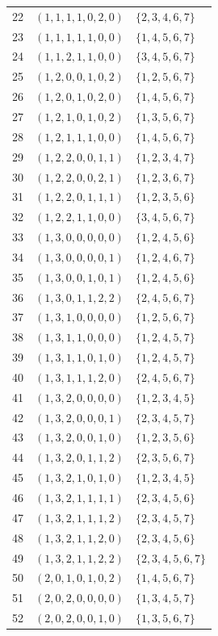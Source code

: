 \documentclass[11pt,a4paper]{article}
\theoremstyle{remark}\newtheorem{remark}[theorem]{Remark}
\begin{document}
{\begin{longtable}{r@{\qquad}c@{\qquad}l}
22 & $(1,1,1,1,0,2,0)$ & $\{2,3,4,6,7\}$ \\
23 & $(1,1,1,1,1,0,0)$ & $\{1,4,5,6,7\}$ \\
24 & $(1,1,2,1,1,0,0)$ & $\{3,4,5,6,7\}$ \\
25 & $(1,2,0,0,1,0,2)$ & $\{1,2,5,6,7\}$ \\
26 & $(1,2,0,1,0,2,0)$ & $\{1,4,5,6,7\}$ \\
27 & $(1,2,1,0,1,0,2)$ & $\{1,3,5,6,7\}$ \\
28 & $(1,2,1,1,1,0,0)$ & $\{1,4,5,6,7\}$ \\
29 & $(1,2,2,0,0,1,1)$ & $\{1,2,3,4,7\}$ \\
30 & $(1,2,2,0,0,2,1)$ & $\{1,2,3,6,7\}$ \\
31 & $(1,2,2,0,1,1,1)$ & $\{1,2,3,5,6\}$ \\
32 & $(1,2,2,1,1,0,0)$ & $\{3,4,5,6,7\}$ \\
33 & $(1,3,0,0,0,0,0)$ & $\{1,2,4,5,6\}$ \\
34 & $(1,3,0,0,0,0,1)$ & $\{1,2,4,6,7\}$ \\
35 & $(1,3,0,0,1,0,1)$ & $\{1,2,4,5,6\}$ \\
36 & $(1,3,0,1,1,2,2)$ & $\{2,4,5,6,7\}$ \\
37 & $(1,3,1,0,0,0,0)$ & $\{1,2,5,6,7\}$ \\
38 & $(1,3,1,1,0,0,0)$ & $\{1,2,4,5,7\}$ \\
39 & $(1,3,1,1,0,1,0)$ & $\{1,2,4,5,7\}$ \\
40 & $(1,3,1,1,1,2,0)$ & $\{2,4,5,6,7\}$ \\
41 & $(1,3,2,0,0,0,0)$ & $\{1,2,3,4,5\}$ \\
42 & $(1,3,2,0,0,0,1)$ & $\{2,3,4,5,7\}$ \\
43 & $(1,3,2,0,0,1,0)$ & $\{1,2,3,5,6\}$ \\
44 & $(1,3,2,0,1,1,2)$ & $\{2,3,5,6,7\}$ \\
45 & $(1,3,2,1,0,1,0)$ & $\{1,2,3,4,5\}$ \\
46 & $(1,3,2,1,1,1,1)$ & $\{2,3,4,5,6\}$ \\
47 & $(1,3,2,1,1,1,2)$ & $\{2,3,4,5,7\}$ \\
48 & $(1,3,2,1,1,2,0)$ & $\{2,3,4,5,6\}$ \\
49 & $(1,3,2,1,1,2,2)$ & $\{2,3,4,5,6,7\}$ \\
50 & $(2,0,1,0,1,0,2)$ & $\{1,4,5,6,7\}$ \\
51 & $(2,0,2,0,0,0,0)$ & $\{1,3,4,5,7\}$ \\
52 & $(2,0,2,0,0,1,0)$ & $\{1,3,5,6,7\}$ \\

\end{longtable}}
\end{document}
